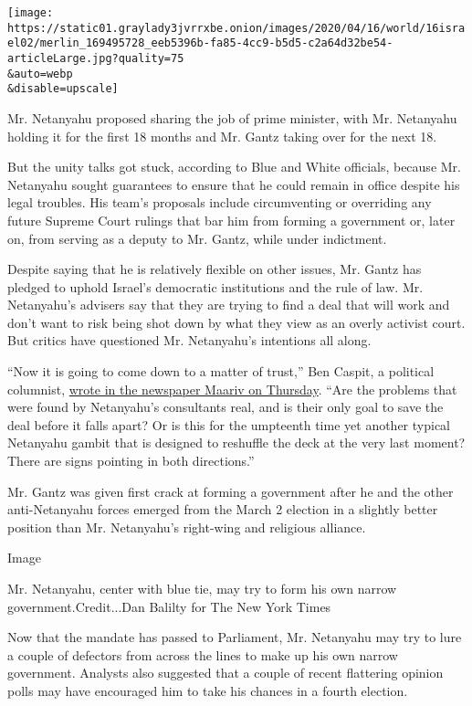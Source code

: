 \texttt{[image: https://static01.graylady3jvrrxbe.onion/images/2020/04/16/world/16israel02/merlin\_169495728\_eeb5396b-fa85-4cc9-b5d5-c2a64d32be54-articleLarge.jpg?quality=75\\\&auto=webp\\\&disable=upscale]}

Mr. Netanyahu proposed sharing the job of prime minister, with Mr.
Netanyahu holding it for the first 18 months and Mr. Gantz taking over
for the next 18.

But the unity talks got stuck, according to Blue and White officials,
because Mr. Netanyahu sought guarantees to ensure that he could remain
in office despite his legal troubles. His team's proposals include
circumventing or overriding any future Supreme Court rulings that bar
him from forming a government or, later on, from serving as a deputy to
Mr. Gantz, while under indictment.

Despite saying that he is relatively flexible on other issues, Mr. Gantz
has pledged to uphold Israel's democratic institutions and the rule of
law. Mr. Netanyahu's advisers say that they are trying to find a deal
that will work and don't want to risk being shot down by what they view
as an overly activist court. But critics have questioned Mr. Netanyahu's
intentions all along.

``Now it is going to come down to a matter of trust,'' Ben Caspit, a
political columnist,
\href{https://www.maariv.co.il/journalists/Article-760128}{wrote in the
newspaper Maariv on Thursday}. ``Are the problems that were found by
Netanyahu's consultants real, and is their only goal to save the deal
before it falls apart? Or is this for the umpteenth time yet another
typical Netanyahu gambit that is designed to reshuffle the deck at the
very last moment? There are signs pointing in both directions.''

Mr. Gantz was given first crack at forming a government after he and the
other anti-Netanyahu forces emerged from the March 2 election in a
slightly better position than Mr. Netanyahu's right-wing and religious
alliance.

Image

Mr. Netanyahu, center with blue tie, may try to form his own narrow
government.Credit...Dan Balilty for The New York Times

Now that the mandate has passed to Parliament, Mr. Netanyahu may try to
lure a couple of defectors from across the lines to make up his own
narrow government. Analysts also suggested that a couple of recent
flattering opinion polls may have encouraged him to take his chances in
a fourth election.

